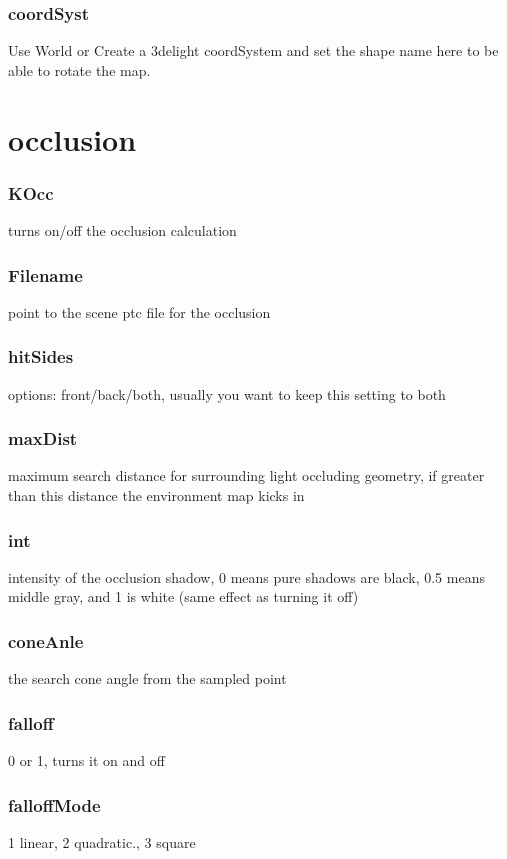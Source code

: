 \documentclass[final,letterpaper,twoside,12pt]{report}
\begin{document}
\smallskip
\subsubsection {coordSyst}
Use World or Create a 3delight coordSystem and set the shape name here to be able to rotate the map.
\smallskip

\section {occlusion}
\subsubsection {KOcc}
turns on/off the occlusion calculation
\smallskip
\subsubsection {Filename}
point to the scene ptc file for the occlusion
\smallskip
\subsubsection {hitSides}
options: front/back/both, usually you want to keep this setting to both
\smallskip
\subsubsection {maxDist}
maximum search distance for surrounding light occluding geometry, if greater than this distance the environment map kicks in
\smallskip
\subsubsection {int}
intensity of the occlusion shadow, 0 means pure shadows are black, 0.5 means middle gray, and 1 is white (same effect as turning it off)
\smallskip
\subsubsection {coneAnle}
the search cone angle from the sampled point
\smallskip
\subsubsection {falloff}
0 or 1, turns it on and off
\smallskip
\subsubsection {falloffMode}
1 linear, 2 quadratic., 3 square
\smallskip
\end{document}
